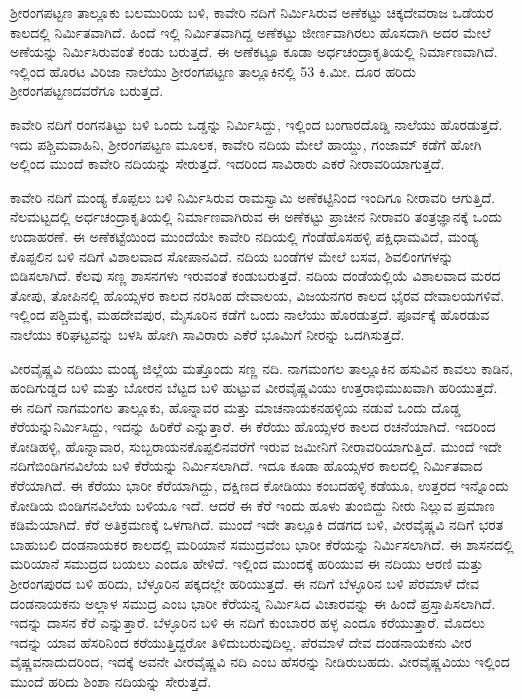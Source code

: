 ಶ‍್ರೀರಂಗಪಟ್ಟಣ ತಾಲ್ಲೂಕು ಬಲಮುರಿಯ ಬಳಿ, ಕಾವೇರಿ ನದಿಗೆ ನಿರ್ಮಿಸಿರುವ ಅಣೆಕಟ್ಟು ಚಿಕ್ಕದೇವರಾಜ ಒಡೆಯರ ಕಾಲದಲ್ಲಿ ನಿರ್ಮಿತವಾಗಿದೆ. ಹಿಂದೆ ಇಲ್ಲಿ ನಿರ್ಮಿತವಾಗಿದ್ದ ಅಣೆಕಟ್ಟು ಜೀರ್ಣವಾಗಿರಲು ಹೊಸದಾಗಿ ಅದರ ಮೇಲೆ ಅಣೆಯನ್ನು ನಿರ್ಮಿಸಿರುವಂತೆ ಕಂಡು ಬರುತ್ತದೆ. ಈ ಅಣೆಕಟ್ಟೂ ಕೂಡಾ ಅರ್ಧಚಂದ್ರಾಕೃತಿಯಲ್ಲಿ ನಿರ್ಮಾಣವಾಗಿದೆ. ಇಲ್ಲಿಂದ ಹೊರಟ ವಿರಿಜಾ ನಾಲೆಯು ಶ‍್ರೀರಂಗಪಟ್ಟಣ ತಾಲ್ಲೂಕಿನಲ್ಲಿ 53 ಕಿ.ಮೀ. ದೂರ ಹರಿದು ಶ‍್ರೀರಂಗಪಟ್ಟಣದವರೆಗೂ ಬರುತ್ತದೆ.

ಕಾವೇರಿ ನದಿಗೆ ರಂಗನತಿಟ್ಟು ಬಳಿ ಒಂದು ಒಡ್ಡನ್ನು ನಿರ್ಮಿಸಿದ್ದು, ಇಲ್ಲಿಂದ ಬಂಗಾರದೊಡ್ಡಿ ನಾಲೆಯು ಹೊರಡುತ್ತದೆ. ಇದು ಪಶ್ಚಿಮವಾಹಿನಿ, ಶ‍್ರೀರಂಗಪಟ್ಟಣ ಮೂಲಕ, ಕಾವೇರಿ ನದಿಯ ಮೇಲೆ ಹಾಯ್ದು, ಗಂಜಾಮ್ ಕಡೆಗೆ ಹೋಗಿ ಅಲ್ಲಿಂದ ಮುಂದೆ ಕಾವೇರಿ ನದಿಯನ್ನು ಸೇರುತ್ತದೆ. ಇದರಿಂದ ಸಾವಿರಾರು ಎಕರೆ ನೀರಾವರಿಯಾಗುತ್ತದೆ.

ಕಾವೇರಿ ನದಿಗೆ ಮಂಡ್ಯ ಕೊಪ್ಪಲು ಬಳಿ ನಿರ್ಮಿಸಿರುವ ರಾಮಸ್ವಾಮಿ ಅಣೆಕಟ್ಟಿನಿಂದ ಇಂದಿಗೂ ನೀರಾವರಿ ಆಗು\-ತ್ತಿದೆ. ನೆಲಮಟ್ಟದಲ್ಲಿ ಅರ್ಧಚಂದ್ರಾಕೃತಿಯಲ್ಲಿ ನಿರ್ಮಾಣವಾಗಿರುವ ಈ ಅಣೆಕಟ್ಟು ಪ್ರಾಚೀನ ನೀರಾವರಿ ತಂತ್ರಜ್ಞಾನಕ್ಕೆ ಒಂದು ಉದಾಹರಣೆ. ಈ ಅಣೆಕಟ್ಟೆಯಿಂದ ಮುಂದೆಯೇ ಕಾವೇರಿ ನದಿಯಲ್ಲಿ ಗೆಂಡೆಹೊಸಹಳ್ಳಿ ಪಕ್ಷಿಧಾಮವಿದೆ, ಮಂಡ್ಯ ಕೊಪ್ಪಲಿನ ಬಳಿ ನದಿಗೆ ವಿಶಾಲವಾದ ಸೋಪಾನವಿದೆ. ನದಿಯ ಬಂಡೆಗಳ ಮೇಲೆ ಬಸವ, ಶಿವಲಿಂಗಗಳನ್ನು ಬಿಡಿಸಲಾಗಿದೆ. ಕೆಲವು ಸಣ್ಣ ಶಾಸನಗಳು ಇರುವಂತೆ ಕಂಡುಬರುತ್ತದೆ. ನದಿಯ ದಂಡೆಯಲ್ಲಿಯೆ ವಿಶಾಲವಾದ ಮರದ ತೋಪು, ತೋಪಿನಲ್ಲಿ ಹೊಯ್ಸಳರ ಕಾಲದ ನರಸಿಂಹ ದೇವಾಲಯ, ವಿಜಯನಗರ ಕಾಲದ ಭೈರವ ದೇವಾಲಯಗಳಿವೆ. ಇಲ್ಲಿಂದ ಪಶ್ಚಿಮಕ್ಕೆ, ಮಹದೇವಪುರ, ಮೈಸೂರಿನ ಕಡೆಗೆ ಒಂದು ನಾಲೆಯು ಹೊರಡುತ್ತದೆ. ಪೂರ್ವಕ್ಕೆ ಹೊರಡುವ ನಾಲೆಯು ಕರಿಘಟ್ಟವನ್ನು ಬಳಸಿ ಹೋಗಿ ಸಾವಿರಾರು ಎಕೆರೆ ಭೂಮಿಗೆ ನೀರನ್ನು ಒದಗಿಸುತ್ತದೆ.

ವೀರವೈಷ್ಣವಿ ನದಿಯು ಮಂಡ್ಯ ಜಿಲ್ಲೆಯ ಮತ್ತೊಂದು ಸಣ್ಣ ನದಿ. ನಾಗಮಂಗಲ ತಾಲ್ಲೂಕಿನ ಹಸುವಿನ ಕಾವಲು ಕಾಡಿನ, ಹಂದಿಗುಡ್ಡದ ಬಳಿ ಮತ್ತು ಬೋರನ ಬೆಟ್ಟದ ಬಳಿ ಹುಟ್ಟುವ ವೀರವೈಷ್ಣವಿಯು ಉತ್ತರಾಭಿಮುಖವಾಗಿ ಹರಿಯುತ್ತದೆ. ಈ ನದಿಗೆ ನಾಗಮಂಗಲ ತಾಲ್ಲೂಕು, ಹೊನ್ನಾವರ ಮತ್ತು ಮಾಚನಾಯಕನಹಳ್ಳಿಯ ನಡುವೆ ಒಂದು ದೊಡ್ಡ ಕೆರೆಯನ್ನು\break ನಿರ್ಮಿಸಿದ್ದು, ಇದನ್ನು ಹಿರಿಕೆರೆ ಎನ್ನುತ್ತಾರೆ. ಈ ಕೆರೆಯು ಹೊಯ್ಸಳರ ಕಾಲದ ರಚನೆಯಾಗಿದೆ. ಇದರಿಂದ ಕೋಡಿಹಳ್ಳಿ, ಹೊನ್ನಾವಾರ, ಸುಬ್ಬರಾಯನಕೊಪ್ಪಲಿನವರೆಗೆ ಇರುವ ಜಮೀನಿಗೆ ನೀರಾವರಿಯಾಗುತ್ತಿದೆ. ಮುಂದೆ ಇದೇ ನದಿಗೆ\break ಬಿಂಡಿಗನವಿಲೆಯ ಬಳಿ ಕೆರೆಯನ್ನು ನಿರ್ಮಿಸಲಾಗಿದೆ. ಇದೂ ಕೂಡಾ ಹೊಯ್ಸಳರ ಕಾಲದಲ್ಲಿ ನಿರ್ಮಿತವಾದ ಕೆರೆ\-ಯಾಗಿದೆ. ಈ ಕೆರೆಯು ಭಾರೀ ಕೆರೆಯಾಗಿದ್ದು, ದಕ್ಷಿಣದ ಕೋಡಿಯು ಕಂಬದಹಳ್ಳಿ ಕಡೆಯೂ, ಉತ್ತರದ ಇನ್ನೊಂದು ಕೋಡಿಯ ಬಿಂಡಿಗನವಿಲೆಯ ಬಳಿಯೂ ಇದೆ. ಆದರೆ ಈ ಕೆರೆ ಇಂದು ಹೂಳು ತುಂಬಿದ್ದು ನೀರು ನಿಲ್ಲುವ ಪ್ರಮಾಣ ಕಡಿಮೆಯಾಗಿದೆ. ಕೆರೆ ಅತಿಕ್ರಮಣಕ್ಕೆ ಒಳಗಾಗಿದೆ. ಮುಂದೆ ಇದೇ ತಾಲ್ಲೂಕಿ ದಡಗದ ಬಳಿ, ವೀರವೈಷ್ಣವಿ ನದಿಗೆ ಭರತ ಬಾಹುಬಲಿ ದಂಡನಾಯಕರ ಕಾಲದಲ್ಲಿ ಮರಿಯಾನೆ ಸಮುದ್ರವೆಂಬ ಭಾರೀ ಕೆರೆಯನ್ನು ನಿರ್ಮಿಸಲಾಗಿದೆ. ಈ ಶಾಸನದಲ್ಲಿ ಮರಿಯಾನೆ ಸಮುದ್ರದ ಬಯಲು ಎಂದೂ ಹೇಳಿದೆ. ಇಲ್ಲಿಂದ ಮುಂದಕ್ಕೆ ಹರಿಯುವ ಈ ನದಿಯು ಆರಣಿ ಮತ್ತು ಶ‍್ರೀರಂಗಪುರದ ಬಳಿ ಹರಿದು, ಬೆಳ್ಳೂರಿನ ಪಕ್ಕದಲ್ಲೇ ಹರಿಯುತ್ತದೆ. ಈ ನದಿಗೆ ಬೆಳ್ಳೂರಿನ ಬಳಿ ಪೆರಮಾಳೆ ದೇವ ದಂಡನಾಯಕನು ಅಲ್ಲಾಳ ಸಮುದ್ರ ಎಂಬ ಭಾರೀ ಕೆರೆಯನ್ನ ನಿರ್ಮಿಸಿದ ವಿಚಾರವನ್ನು ಈ ಹಿಂದೆ ಪ್ರಸ್ತಾಪಿಸಲಾಗಿದೆ. ಇದನ್ನು ದಾಸನ ಕೆರೆ ಎನ್ನುತ್ತಾರೆ. ಬೆಳ್ಳೂರಿನ ಬಳಿ ಈ ನದಿಗೆ ಕುಂಬಾರರ ಹಳ್ಳ ಎಂದೂ ಕರೆಯುತ್ತಾರೆ. ಮೊದಲು ಇದನ್ನು ಯಾವ ಹೆಸರಿನಿಂದ ಕರೆಯುತ್ತಿದ್ದರೋ ತಿಳಿದುಬರುವುದಿಲ್ಲ. ಪೆರಮಾಳೆ ದೇವ ದಂಡನಾಯಕನು ವೀರ ವೈಷ್ಣವನಾದುದರಿಂದ, ಇದಕ್ಕೆ ಅವನೇ ವೀರವೈಷ್ಣವಿ ನದಿ ಎಂಬ ಹೆಸರನ್ನು ನೀಡಿರುಬಹದು. ವೀರವೈಷ್ಣವಿಯು ಇಲ್ಲಿಂದ ಮುಂದೆ ಹರಿದು ಶಿಂಶಾ ನದಿಯನ್ನು ಸೇರುತ್ತದೆ.

